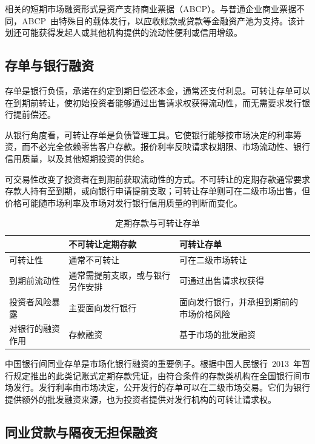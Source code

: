 相关的短期市场融资形式是资产支持商业票据（ABCP）。与普通企业商业票据不同，ABCP~由特殊目的载体发行，以应收账款或贷款等金融资产池为支持。该计划还可能获得发起人或其他机构提供的流动性便利或信用增级。

\subsection{存单与银行融资}

存单是银行负债，承诺在约定到期日偿还本金，通常还支付利息。可转让存单可以在到期前转让，使初始投资者能够通过出售请求权获得流动性，而无需要求发行银行提前偿还。

从银行角度看，可转让存单是负债管理工具。它使银行能够按市场决定的利率筹资，而不必完全依赖零售客户存款。报价利率反映请求权期限、市场流动性、银行信用质量，以及其他短期投资的供给。

可交易性改变了投资者在到期前获取流动性的方式。不可转让的定期存款通常要求存款人持有至到期，或向银行申请提前支取；可转让存单则可在二级市场出售，但价格可能随市场利率及市场对发行银行信用质量的判断而变化。

\begin{table}[H]
\centering
\caption{定期存款与可转让存单}
\label{tab:ch7-cd-comparison}

\begin{tabularx}{\textwidth}{lXX}
\toprule
 & \textbf{不可转让定期存款} & \textbf{可转让存单} \\
\midrule

可转让性 & 通常不可转让 & 可在二级市场转让 \\

到期前流动性 & 通常需提前支取，或与银行另作安排 & 可通过出售请求权获得 \\

投资者风险暴露 & 主要面向发行银行 & 面向发行银行，并承担到期前的市场价格风险 \\

对银行的融资作用 & 存款融资 & 基于市场的批发融资 \\

\bottomrule
\end{tabularx}
\end{table}

中国银行间同业存单是市场化银行融资的重要例子。根据中国人民银行~2013~年暂行规定推出的此类记账式定期存款凭证，由符合条件的存款类机构在全国银行间市场发行。发行利率由市场决定，公开发行的存单可以在二级市场交易。它们为银行提供额外的批发融资来源，也为投资者提供对发行机构的可转让请求权。

\subsection{同业贷款与隔夜无担保融资}

